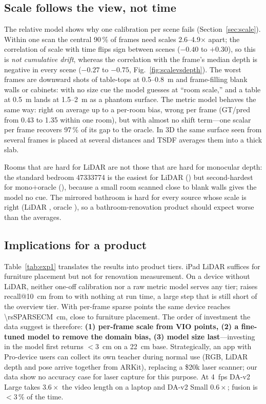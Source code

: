 \subsection{Scale follows the view, not time}\label{sec:drift}\label{sec:metric}
The relative model shows why one calibration per scene fails (Section~\ref{sec:scale}). Within one scan the central
90\,\% of frames need scales 2.6--4.9$\times$ apart; the correlation of scale with time flips sign between scenes
($-0.40$ to $+0.30$), so this is \emph{not cumulative drift}, whereas the correlation with the frame's median depth is
negative in every scene ($-0.27$ to $-0.75$, Fig.~\ref{fig:scalevsdepth}). The worst frames are
downward shots of table-tops at 0.5--\SI{0.8}{m} and frame-filling blank walls or cabinets: with no size cue the model
guesses at ``room scale,'' and a table at \SI{0.5}{m} lands at 1.5--\SI{2}{m} as a phantom surface. The metric model
behaves the same way: right on average up to a per-room bias, wrong per frame (GT/pred from 0.43 to 1.35 within one
room), but with almost no shift term---one scalar per frame recovers 97\,\% of its gap to the oracle. In 3D the same
surface seen from several frames is placed at several distances and TSDF averages them into a thick slab.

Rooms that are hard for LiDAR are not those that are hard for monocular depth: the standard bedroom 47333774 is the
easiest for LiDAR (\rsLIDARb) but second-hardest for mono$+$oracle (\rsORACLEb), because a small room scanned close to
blank walls gives the model no cue. The mirrored bathroom is hard for every source whose scale is right (LiDAR
\rsLIDARd, oracle \rsORACLEd), so a bathroom-renovation product should expect worse than the averages.

\subsection{Implications for a product}\label{sec:business}
Table~\ref{tab:exp1} translates the results into product tiers. iPad LiDAR suffices for furniture placement but not
for renovation measurement. On a device without LiDAR, neither one-off calibration nor a raw metric model serves any
tier; \ftmain{} raises recall@\SI{10}{cm} from \rsMETRICRten{} to \rsFTLIDARALLRten{} with nothing at run time, a large step
that is still short of the overview tier. With per-frame sparse points the same device reaches \SI{\rsSPARSECM}{cm},
close to furniture placement. The order of investment the data suggest is therefore: \textbf{(1) per-frame scale from
VIO points, (2) a fine-tuned model to remove the domain bias, (3) model size last}---investing in the model first
returns $<$\SI{3}{cm} on a \SI{22}{cm} base. Strategically, an app with Pro-device users can collect its own teacher
during normal use (RGB, LiDAR depth and pose arrive together from ARKit), replacing a \$20k laser scanner; our data
show no accuracy case for laser capture for this purpose. At 4~fps DA-v2 Large takes $3.6\times$ the video length on
a laptop and DA-v2 Small $0.6\times$; fusion is $<3\,\%$ of the time.
